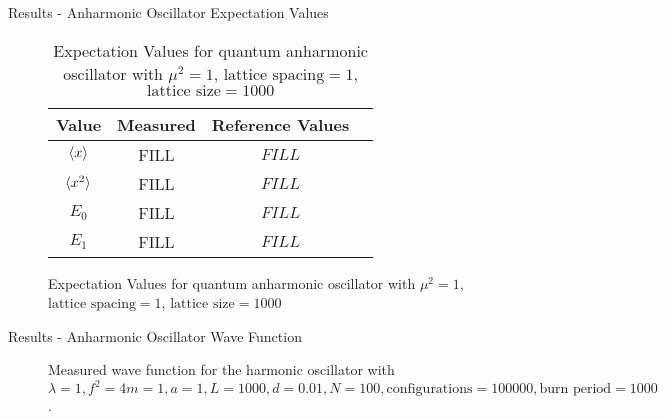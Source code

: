 \documentclass{beamer}
\begin{document}
\begin{frame}{Results - Anharmonic Oscillator Expectation Values}
    \begin{figure}
        \begin{table}
            \begin{tabular}{c | c | c | c }
                Value & Measured & Reference Values \\
                \hline \hline
                $\braket{x}$   & FILL &  $FILL$             \\ 
                $\braket{x^2}$ & FILL &  $FILL$  \\
                $E_0$          & FILL &  $FILL$  \\
                $E_1$          & FILL &  $FILL$             
            \end{tabular}
            \caption{Expectation Values for quantum anharmonic oscillator with $\mu^2 = 1$, $\text{lattice spacing} = 1$, $\text{lattice size} = 1000$}
        \end{table}
    \end{figure}
\end{frame}

\begin{frame}{Results - Anharmonic Oscillator Wave Function}
    \begin{figure}
    \centering
        \caption{Measured wave function for the harmonic oscillator with $\lambda = 1, f^2=4 m = 1, a = 1, L = 1000, d = 0.01, N = 100, \text{configurations} = 100000, \text{burn period} = 1000$.}
    \end{figure}
\end{frame}
\end{document}
